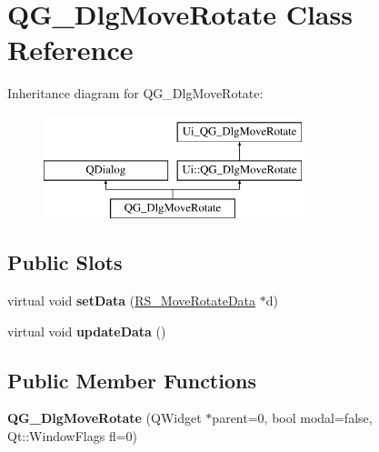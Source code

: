 \hypertarget{classQG__DlgMoveRotate}{\section{Q\-G\-\_\-\-Dlg\-Move\-Rotate Class Reference}
\label{classQG__DlgMoveRotate}
}
Inheritance diagram for Q\-G\-\_\-\-Dlg\-Move\-Rotate\-:\begin{figure}[H]
\begin{center}
\leavevmode
\includegraphics[height=3.000000cm]{classQG__DlgMoveRotate}
\end{center}
\end{figure}
\subsection*{Public Slots}
\begin{DoxyCompactItemize}
\item 
\hypertarget{classQG__DlgMoveRotate_afb814b7bbbaa0ca3d744428747b82a88}{virtual void {\bfseries set\-Data} (\hyperlink{classRS__MoveRotateData}{R\-S\-\_\-\-Move\-Rotate\-Data} $\ast$d)}\label{classQG__DlgMoveRotate_afb814b7bbbaa0ca3d744428747b82a88}

\item 
\hypertarget{classQG__DlgMoveRotate_ae5cce6bad28d5e3a2d48d115f27390f5}{virtual void {\bfseries update\-Data} ()}\label{classQG__DlgMoveRotate_ae5cce6bad28d5e3a2d48d115f27390f5}

\end{DoxyCompactItemize}
\subsection*{Public Member Functions}
\begin{DoxyCompactItemize}
\item 
\hypertarget{classQG__DlgMoveRotate_ac7ad2eeb9ae449c4218745fbf79d223d}{{\bfseries Q\-G\-\_\-\-Dlg\-Move\-Rotate} (Q\-Widget $\ast$parent=0, bool modal=false, Qt\-::\-Window\-Flags fl=0)}\label{classQG__DlgMoveRotate_ac7ad2eeb9ae449c4218745fbf79d223d}

\end{DoxyCompactItemize}
